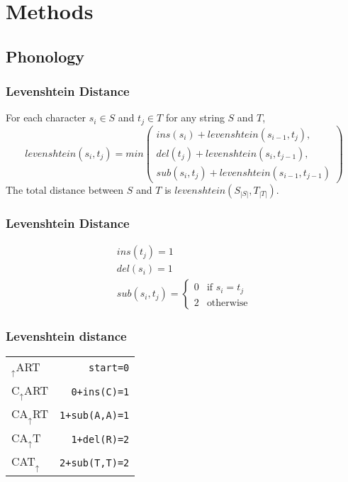 \documentclass{beamer}
\begin{document}
\section{Methods}
\subsection{Phonology}
\begin{frame}
\frametitle{Levenshtein Distance}
\begin{definition}
For each character $s_i \in S$ and $t_j \in T$ for any string $S$ and $T$,
\begin{equation}
  levenshtein(s_i,t_j) = min \left(
  \begin{array}{l}
   ins(s_i)+levenshtein(s_{i-1},t_j), \\
 del(t_j)+levenshtein(s_i,t_{j-1}), \\
 sub(s_i,t_j)+levenshtein(s_{i-1},t_{j-1})
   \end{array} \right)
   \label{levequation}
\end{equation}
The total distance between $S$ and $T$ is $levenshtein(S_{|S|},T_{|T|})$.
\end{definition}
\end{frame}
\begin{frame}
\frametitle{Levenshtein Distance}
\begin{definition}
\begin{equation}
\begin{array}{l}
   ins(t_j) = 1 \\
   del(s_i) = 1 \\
   sub(s_i,t_j) = \left\{
     \begin{array}{ll}
       0 & \textrm{if $s_i=t_j$} \\
       2 & \textrm{otherwise}
     \end{array} \right.

   \end{array}
\end{equation}
\end{definition}
\end{frame}
\begin{frame}
  \frametitle{Levenshtein distance}
  \begin{example}
    \begin{tabular}{l|r}
    $_\uparrow$ART &   {\tt start=0} \\
\pause
    C$_\uparrow$ART & {\tt 0+ins(C)=1} \\
\pause
    CA$_\uparrow$RT & {\tt 1+sub(A,A)=1} \\
\pause
    CA$_\uparrow$T & {\tt 1+del(R)=2} \\
\pause
    CAT$_\uparrow$ & {\tt 2+sub(T,T)=2} \\
    \end{tabular}
  \end{example}

\end{frame}
\end{document}
